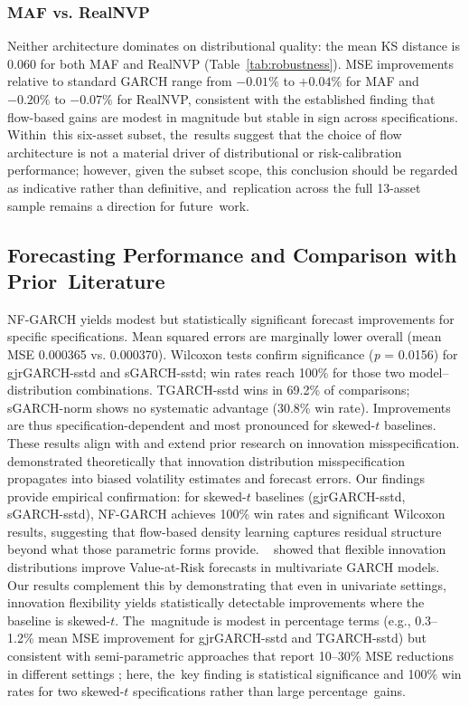 \documentclass[risks,article,accept,pdftex,moreauthors]{Definitions/mdpi}
\begin{document}
\subsubsection{MAF vs. RealNVP}

 Neither architecture dominates on distributional quality: the mean KS distance is 0.060 for both MAF and RealNVP (Table~\ref{tab:robustness}). MSE improvements relative to standard GARCH range from $-0.01\%$ to $+0.04\%$ for MAF and $-0.20\%$ to $-0.07\%$ for RealNVP, consistent with the established finding that flow-based gains are modest in magnitude but stable in sign across specifications. Within~this six-asset subset, the~results suggest that the choice of flow architecture is not a material driver of distributional or risk-calibration performance; however, given the subset scope, this conclusion should be regarded as indicative rather than definitive, and~replication across the full 13-asset sample remains a direction for future~work.




\subsection{Forecasting Performance and Comparison with Prior~Literature}

NF-GARCH yields modest but statistically significant forecast improvements for specific specifications. Mean squared errors are marginally lower overall (mean MSE 0.000365 vs. 0.000370). Wilcoxon tests confirm significance (\emph{p} = 0.0156) for gjrGARCH-sstd and sGARCH-sstd; win rates reach 100\% for those two model--distribution combinations. TGARCH-sstd wins in 69.2\% of comparisons; sGARCH-norm shows no systematic advantage (30.8\% win rate). Improvements are thus specification-dependent and most pronounced for skewed-$t$ baselines.
\clearpage
These results align with and extend prior research on innovation misspecification. \citep{hansen1994autoregressive} demonstrated theoretically that innovation distribution misspecification propagates into biased volatility estimates and forecast errors. Our findings provide \mbox{empirical} confirmation: for skewed-$t$ baselines (gjrGARCH-sstd, sGARCH-sstd), NF-GARCH achieves 100\% win rates and significant Wilcoxon results, suggesting that flow-based density learning captures residual structure beyond what those parametric forms provide.
~\cite{bauwens2006multivariate} showed that flexible innovation distributions improve Value-at-Risk forecasts in multivariate GARCH models. Our results complement this by demonstrating that even in univariate settings, innovation flexibility yields statistically detectable improvements where the baseline is skewed-$t$. The~magnitude is modest in percentage terms (e.g., 0.3--1.2\% mean MSE improvement for gjrGARCH-sstd and TGARCH-sstd) but consistent with semi-parametric approaches that report 10--30\% MSE reductions in different settings \citep{engle1993measuring}; here, the~key finding is statistical significance and 100\% win rates for two skewed-$t$ specifications rather than large percentage~gains.
\end{document}
